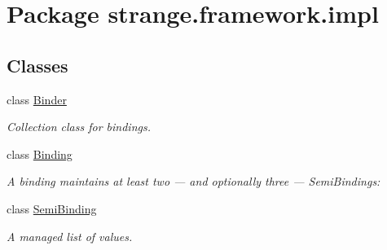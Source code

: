 \hypertarget{namespacestrange_1_1framework_1_1impl}{\section{Package strange.\-framework.\-impl}
\label{namespacestrange_1_1framework_1_1impl}
}
\subsection*{Classes}
\begin{DoxyCompactItemize}
\item 
class \hyperlink{classstrange_1_1framework_1_1impl_1_1_binder}{Binder}
\begin{DoxyCompactList}\small\item\em Collection class for bindings. \end{DoxyCompactList}\item 
class \hyperlink{classstrange_1_1framework_1_1impl_1_1_binding}{Binding}
\begin{DoxyCompactList}\small\item\em A binding maintains at least two — and optionally three — Semi\-Bindings\-: \end{DoxyCompactList}\item 
class \hyperlink{classstrange_1_1framework_1_1impl_1_1_semi_binding}{Semi\-Binding}
\begin{DoxyCompactList}\small\item\em A managed list of values. \end{DoxyCompactList}\end{DoxyCompactItemize}
